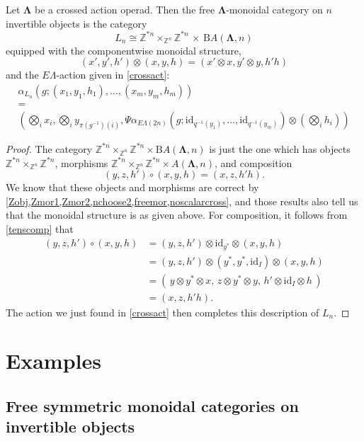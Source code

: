 \documentclass{amsbook} %
\newcommand{\id}{\textrm{id}}
\newcommand{\ML}{\mathbf{\Lambda}}
\newcommand{\ELnn}{E\Lambda(\underline{2n})}
\numberwithin{section}{chapter}
\begin{document}
\begin{thm}\label{freeinvalgc} Let $\ML$ be a crossed action operad. Then the free $\ML$-monoidal category on $n$ invertible objects is the category
  \[
    L_n \cong \mathbb{Z}^{\ast n} \times_{\mathbb{Z}^n} \mathbb{Z}^{\ast n}  \, \times \, \mathrm{B}A(\ML,n)
  \]
equipped with the componentwise monoidal structure,
  \[
    (x', y' ,h') \otimes (x, y, h) = (x' \otimes x, y' \otimes y, h'h)
  \]
and the $E\Lambda$-action given in \cref{crossact}:
  \[
    \begin{array}{c}
			\alpha_{L_n}\left(g;(x_1, y_1, h_1), \ldots, (x_m, y_m, h_m) \right) \\
			= \\
			\left(\bigotimes_i x_i, \bigotimes_i y_{\pi(g^{-1})(i)}, \Psi \alpha_{\ELnn}\left(g;\id_{q^{-1}(y_1)}, \ldots, \id_{q^{-1}(y_m)}\right) \otimes \left(\bigotimes_i h_i\right)\right) 
  	\end{array}
  \]
\end{thm}
\begin{proof}
The category $\mathbb{Z}^{\ast n} \times_{\mathbb{Z}^n} \mathbb{Z}^{\ast n} \times \mathrm{B}A(\ML,n)$ is just the one which has objects $\mathbb{Z}^{\ast n} \times_{\mathbb{Z}^n} \mathbb{Z}^{\ast n}$, morphisms $\mathbb{Z}^{\ast n} \times_{\mathbb{Z}^n} \mathbb{Z}^{\ast n} \times A(\ML,n)$, and composition 
  \[
    (y, z , h') \circ (x, y, h) = (x, z, h'h).
  \]
We know that these objects and morphisms are correct by \cref{Zobj,Zmor1,Zmor2,nchoose2,freemor,noscalarcross}, and those results also tell us that the monoidal structure is as given above. For composition, it follows from \cref{tenscomp} that
  \begin{align*}
			(y, z , h') \circ (x, y, h) &= (y, z , h') \otimes \id_{y^*} \otimes (x, y, h) \\
			&= (y, z , h') \otimes (y^*, y^*, \id_I) \otimes (x, y, h) \\
			&= (\, y \otimes y^* \otimes x, \,  z \otimes y^* \otimes y, \, h' \otimes \id_I \otimes h \, ) \\
			&= (x, z, h'h).
	\end{align*}
The action we just found in \cref{crossact} then completes this description of $L_n$.
\end{proof}

\chapter{Examples}

\section{Free symmetric monoidal categories on invertible objects}
\end{document}
